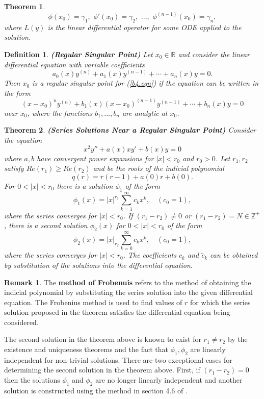 \documentclass[12pt]{article}
\newtheorem{theorem}{Theorem}[section]
\newtheorem{definition}{Definition}[section]
\theoremstyle{definition}
\newtheorem*{remark}{Remark}
\numberwithin{equation}{section}
\begin{document}
{\begin{theorem}
$$ \phi(x_0)=\gamma_1,\,\,\phi'(x_0)=\gamma_2,\,\,...,\,\,\phi^{(n-1)}(x_0)=\gamma_n,$$
where $L(y)$ is the linear differential operator for some ODE applied to the solution.
\end{theorem}
\begin{definition}\textbf{(Regular Singular Point)}
Let $x_0\in\mathbb{R}$ and consider the linear differential equation with variable coefficients
\begin{equation}
a_0(x)y^{(n)}+a_1(x)y^{(n-1)}+\cdots +a_n(x)y=0.
\label{b4.eqn}
\end{equation}
Then $x_0$ is a regular singular point for (\ref{b4.eqn}) if the equation can be written in the form
$$(x-x_0)^ny^{(n)}+b_1(x)(x-x_0)^{(n-1)}y^{(n-1)}+\cdots+b_n(x)y=0$$ near $x_0$, where the functions $b_1,...,b_n$ are analytic at $x_0$. 
\end{definition}
\begin{theorem}\label{thm1}\textbf{(Series Solutions Near a Regular Singular Point)}
Consider the equation
$$x^2y''+a(x)xy'+b(x)y=0$$
where $a,b$ have convergent power expansions for $\vert x\vert<r_0$ and $r_0>0$. Let $r_1,r_2$ satisfy $Re(r_1)\geq Re(r_2)$ and be the roots of the indicial polynomial
$$q(r)=r(r-1)+a(0)r+b(0).$$
For $0<\vert{x}\vert<r_0$ there is a solution $\phi_1$ of the form
$$\phi_1(x)=\vert{x}\vert^{r_1}\sum_{k=1}^\infty c_kx^k,\quad (c_0=1),$$
where the series converges for $\vert{x}\vert<r_0$. If $(r_1-r_2)\neq 0$ or $(r_1-r_2)=N\in\mathbb{Z}^{+}$, there is a second solution $\phi_2(x)$ for $0<\vert{x}\vert<r_0$ of the form
$$\phi_2(x)=\vert{x}\vert_{r_2}\sum_{k=0}^\infty \tilde{c}_kx^k,\quad(\tilde{c}_0=1),$$
where the series converges for $\vert{x}\vert<r_0$. The coefficients $c_k$ and $\tilde{c}_k$ can be obtained by substitution of the solutions into the differential equation.
\end{theorem}
\begin{remark}
The \textbf{method of Frobenuis} refers to the method of obtaining the indicial polynomial by substituting the series solution into the given differential equation. The Frobenius method is used to find values of $r$ for which the series solution proposed in the theorem satisfies the differential equation being considered.
\end{remark}

The second solution in the theorem above is known to exist for $r_1\neq r_2$ by the existence and uniqueness theorems and the fact that $\phi_1,\phi_2$ are linearly independent for non-trivial solutions. There are two exceptional cases for determining the second solution in the theorem above. First, if $(r_1-r_2)=0$ then the solutions $\phi_1$ and $\phi_2$ are no longer linearly independent and another solution is constructed using the method in section 4.6 of \cite{Codd}.

}
\end{document}
